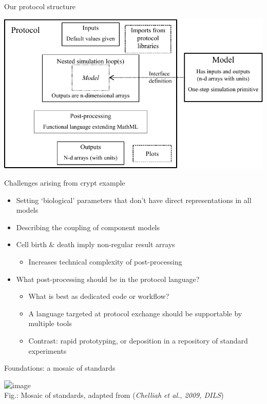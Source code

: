 \documentclass[t,xcolor={usenames,dvipsnames}]{beamer}
\newcommand{\subitem}[1]{\begin{itemize}[<.->]\item #1 \end{itemize}}
\begin{document}
\begin{frame}{Our protocol structure}
\begin{center}
\includegraphics[width=\textwidth]{protocol_language}
\end{center}
\end{frame}


\begin{frame}{Challenges arising from crypt example}
\begin{itemize}
\item Setting `biological' parameters that don't have direct representations in all models
\item Describing the coupling of component models
\item Cell birth \& death imply non-regular result arrays
  \subitem{Increases technical complexity of post-processing}
\item What post-processing should be in the protocol language?
  \begin{itemize}[<.->]
  \item What is best as dedicated code or workflow?
  \item A language targeted at protocol exchange should be supportable by multiple tools
  \item Contrast: rapid prototyping, or deposition in a repository of standard experiments
  \end{itemize}
\end{itemize}
\end{frame}


\begin{frame}{Foundations: a mosaic of standards}
\begin{center}
\includegraphics<1->[scale=.5]{standards_mosaic}\\
{\tiny Fig.: Mosaic of standards, adapted from (\textit{Chelliah et al., 2009, DILS})}
\end{center}
\end{frame}
\end{document}
